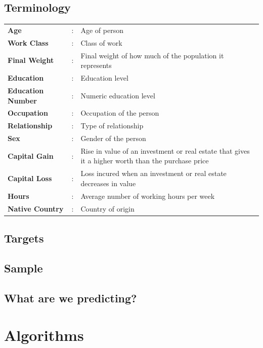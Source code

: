 \documentclass[12pt]{article}
\renewcommand{\arraystretch}{1.2}
\begin{document}
	\setlength{\arrayrulewidth}{0.0mm}
	\setlength{\tabcolsep}{15pt}
	\renewcommand{\arraystretch}{1.2}
	
	\subsection{Terminology}
	\begin{tabular}{|p{3cm}|p{1cm}|p{10cm}|}
		{\bfseries Age}&:&Age of person\\
		{\bfseries Work Class}&:&Class of work\\
		{\bfseries Final Weight}&:&Final weight of how much of the population it represents\\
		{\bfseries Education}&:&Education level\\
		{\bfseries Education Number}&:&Numeric education level\\
		{\bfseries Occupation}&:&Occupation of the person\\
		{\bfseries Relationship}&:&Type of relationship\\
		{\bfseries Sex}&:&Gender of the person\\
		{\bfseries Capital Gain}&:&Rise in value of an investment or real estate that gives it a higher worth than the purchase price\\
		{\bfseries Capital Loss}&:&Loss incured when an investment or real estate decreases in value\\
		{\bfseries Hours}&:&Average number of working hours per week\\
		{\bfseries Native Country}&:&Country of origin\\
	\end{tabular}
	
	\subsection{Targets}
	\subsection{Sample}
	\subsection{What are we predicting?}
	\newpage
	
	\section{Algorithms}
	
\end{document}
